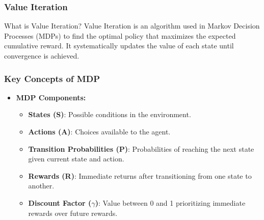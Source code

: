 \documentclass[aspectratio=169]{beamer}
\begin{document}
\begin{frame}[fragile]
    \frametitle{Value Iteration}
    \begin{block}{What is Value Iteration?}
        Value Iteration is an algorithm used in Markov Decision Processes (MDPs) to find the optimal policy that maximizes the expected cumulative reward. It systematically updates the value of each state until convergence is achieved.
    \end{block}
\end{frame}

\begin{frame}[fragile]
    \frametitle{Key Concepts of MDP}
    \begin{itemize}
        \item \textbf{MDP Components:}
        \begin{itemize}
            \item \textbf{States (S)}: Possible conditions in the environment.
            \item \textbf{Actions (A)}: Choices available to the agent.
            \item \textbf{Transition Probabilities (P)}: Probabilities of reaching the next state given current state and action.
            \item \textbf{Rewards (R)}: Immediate returns after transitioning from one state to another.
            \item \textbf{Discount Factor ($\gamma$)}: Value between 0 and 1 prioritizing immediate rewards over future rewards.
        \end{itemize}
    \end{itemize}
\end{frame}
\end{document}

